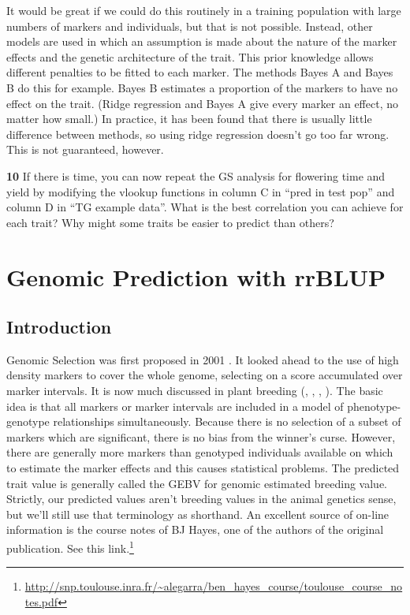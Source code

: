 \documentclass[
]{book}
\makeatletter
\renewcommand{\href}[2]{#2\footnote{\url{#1}}}
\newenvironment{kframe}{%
\medskip{}
\setlength{\fboxsep}{.8em}
 \def\at@end@of@kframe{}%
 \ifinner\ifhmode%
  \def\at@end@of@kframe{\end{minipage}}%
  \begin{minipage}{\columnwidth}%
 \fi\fi%
 \def\FrameCommand##1{\hskip\@totalleftmargin \hskip-\fboxsep
 \colorbox{shadecolor}{##1}\hskip-\fboxsep
     \hskip-\linewidth \hskip-\@totalleftmargin \hskip\columnwidth}%
 \MakeFramed {\advance\hsize-\width
   \@totalleftmargin\z@ \linewidth\hsize
   \@setminipage}}%
 {\par\unskip\endMakeFramed%
 \at@end@of@kframe}
\newenvironment{rmdblock}[1]
  {
  \begin{itemize}
  \renewcommand{\labelitemi}{
    \raisebox{-.7\height}[0pt][0pt]{
      {\setkeys{Gin}{width=3em,keepaspectratio}\texttt{[image: images/\#1]}}
    }
  }
  \setlength{\fboxsep}{1em}
  \begin{kframe}
  \item
  }
  {
  \end{kframe}
  \end{itemize}
  }
\newenvironment{rmdquiz}
  {\begin{rmdblock}{quiz}}
  {\end{rmdblock}}
\makeatother
\begin{document}
It would be great if we could do this routinely in a training population with large numbers of markers and individuals, but that is not possible. Instead, other models are used in which an assumption is made about the nature of the marker effects and the genetic architecture of the trait. This prior knowledge allows different penalties to be fitted to each marker. The methods Bayes A and Bayes B do this for example. Bayes B estimates a proportion of the markers to have no effect on the trait. (Ridge regression and Bayes A give every marker an effect, no matter how small.) In practice, it has been found that there is usually little difference between methods, so using ridge regression doesn't go too far wrong. This is not guaranteed, however.

\begin{rmdquiz}
\textbf{10}
If there is time, you can now repeat the GS analysis for flowering time and yield by modifying the vlookup functions in column C in ``pred in test pop'' and column D in ``TG example data''. What is the best correlation you can achieve for each trait? Why might some traits be easier to predict than others?
\end{rmdquiz}

\hypertarget{genomic-prediction-with-rrblup}{%
\section{Genomic Prediction with rrBLUP}\label{genomic-prediction-with-rrblup}}

\hypertarget{introduction-5}{%
\subsection{Introduction}\label{introduction-5}}

Genomic Selection was first proposed in 2001 \citep{Meuwissen1819}. It looked ahead to the use of high density markers to cover the whole genome, selecting on a score accumulated over marker intervals. It is now much discussed in plant breeding (\citet{Bernardo2007}, \citet{Heffner2009},
\citet{Piepho2009}, \citet{Jannink2010}). The basic idea is that all markers or marker intervals are included in a model of phenotype-genotype relationships simultaneously. Because there is no selection of a subset of markers which are significant, there is no bias from the winner's curse. However, there are generally more markers than genotyped individuals available on which to estimate the marker effects and this causes statistical problems. The predicted
trait value is generally called the GEBV for genomic estimated breeding value. Strictly, our
predicted values aren't breeding values in the animal genetics sense, but we'll still use that terminology as shorthand. An excellent source of on-line information is the course notes of BJ Hayes, one of the authors of the original publication. \href{http://snp.toulouse.inra.fr/~alegarra/ben_hayes_course/toulouse_course_notes.pdf}{See this link.}
\end{document}
